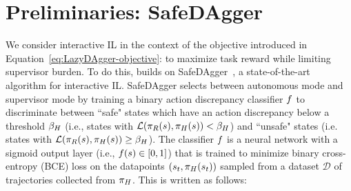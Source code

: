 \section{Preliminaries: SafeDAgger}
\label{sec:prelims}
We consider interactive IL in the context of the objective introduced in Equation~\eqref{eq:LazyDAgger-objective}: to maximize task reward while limiting supervisor burden. To do this, \algabbr builds on SafeDAgger~\cite{safe_dagger}, a state-of-the-art algorithm for interactive IL. SafeDAgger selects between autonomous mode and supervisor mode by training a binary action discrepancy classifier $f$ to discriminate between ``safe" states which have an action discrepancy below a threshold $\beta_{H}$ (i.e., states with ${\mathcal{L}(\pi_{R}(s), \pi_{H}(s)) < \beta_{H}}$) and ``unsafe" states (i.e. states with ${\mathcal{L}(\pi_{R}(s), \pi_{H}(s)) \geq \beta_{H}}$). The classifier $f$ is a neural network with a sigmoid output layer (i.e., $f(s) \in [0, 1]$) that is trained to minimize binary cross-entropy (BCE) loss on the datapoints $(s_t,\pi_{H}(s_t))$ sampled from a dataset $\mathcal{D}$ of trajectories collected from $\pi_{H}$. This is written as follows:
